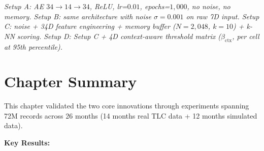 \medskip
\textit{Setup A: AE $34\!\rightarrow\!14\!\rightarrow\!34$, ReLU, lr=$0.01$, epochs=$1{,}000$, no noise, no memory.
Setup B: same architecture with noise $\sigma=0.001$ on raw 7D input.
Setup C: noise + 34D feature engineering + memory buffer ($N=2{,}048$, $k=10$) + k-NN scoring.
Setup D: Setup C + 4D context-aware threshold matrix ($\beta_{\mathrm{ctx}}$, per cell at 95th percentile).}


\section{Chapter Summary}

This chapter validated the two core innovations through experiments spanning 72M records across 26 months (14 months real TLC data + 12 months simulated data).

\textbf{Key Results:}

